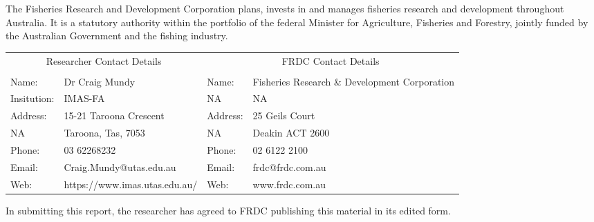 The Fisheries Research and Development Corporation plans, invests in and manages fisheries research and development throughout Australia. It is a statutory authority within the portfolio of the federal Minister for Agriculture, Fisheries and Forestry, jointly funded by the Australian Government and the fishing industry.

\newpage
\begin{longtable}{p{2.0cm}p{5.5cm}p{2.0cm}p{5.5cm}}
\toprule
\multicolumn{2}{c}{Researcher Contact Details} & \multicolumn{2}{c}{FRDC Contact Details} \\ 
\cmidrule(lr){1-2} \cmidrule(lr){3-4}
 &  &  &  \\ 
\midrule
Name: & Dr Craig Mundy & Name: & Fisheries Research \& Development Corporation \\ 
Insitution: & IMAS-FA & NA & NA \\ 
Address: & 15-21 Taroona Crescent & Address: & 25 Geils Court \\ 
NA & Taroona, Tas, 7053 & NA & Deakin ACT 2600 \\ 
Phone: & 03 62268232 & Phone: & 02 6122 2100 \\ 
Email: & Craig.Mundy@utas.edu.au & Email: & frdc@frdc.com.au \\ 
Web: & https://www.imas.utas.edu.au/ & Web: & www.frdc.com.au \\ 
\bottomrule
\end{longtable}

In submitting this report, the researcher has agreed to FRDC publishing this material in its edited form.
